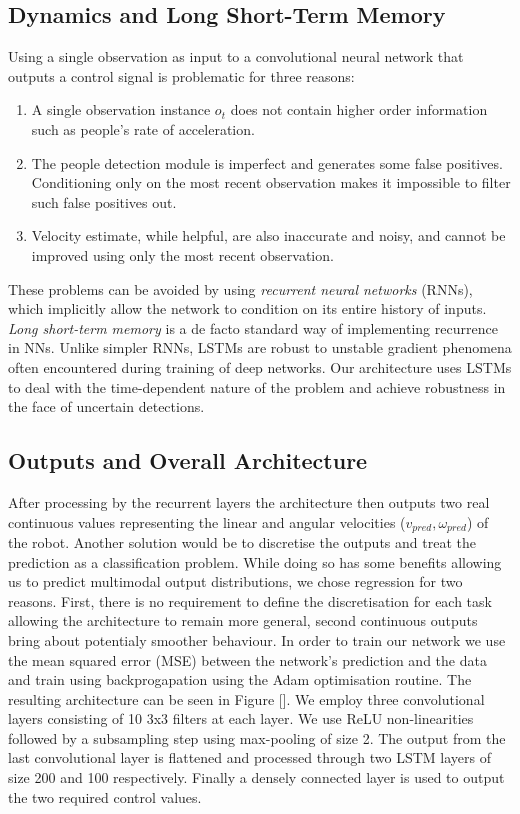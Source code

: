 \documentclass[letterpaper, 10 pt, conference]{ieeeconf}
\begin{document}
\subsection{Dynamics and Long Short-Term Memory}
Using a single observation as input to a convolutional neural network that outputs a control signal is problematic for three reasons:

\begin{enumerate}
\item A single observation instance $o_t$ does not contain higher order information such as people's rate of  acceleration.
\item The people detection module is imperfect and generates some false positives.  Conditioning only on the most recent observation makes it impossible to filter such false positives out.
\item Velocity estimate, while helpful, are also inaccurate and noisy, and cannot be improved using only the most recent observation.
\end{enumerate}

These problems can be avoided by using \emph{recurrent neural networks} (RNNs), which implicitly allow the network to condition on its entire history of inputs.  \emph{Long short-term memory} \cite{hochreiter1997long} is a de facto standard way of implementing recurrence in NNs. Unlike simpler RNNs, LSTMs are robust to unstable gradient phenomena often encountered during training of deep networks. Our architecture uses LSTMs to deal with the time-dependent nature of the problem and achieve robustness in the face of uncertain detections.

\subsection{Outputs and Overall Architecture}
After processing by the recurrent layers the architecture then outputs two real continuous values representing the linear and angular velocities ($v_{pred},\omega_{pred}$) of the robot. Another solution would be to discretise the outputs and treat the prediction as a classification problem. While doing so has some benefits allowing us to predict multimodal output distributions, we chose regression for two reasons. First, there is no requirement to define the discretisation for each task allowing the architecture to remain more general, second continuous outputs bring about potentialy smoother behaviour. In order to train our network we use the mean squared error (MSE) between the network's prediction and the data and train using backprogapation using the Adam \cite{kingma2014adam} optimisation routine. The resulting architecture can be seen in Figure []. We employ three convolutional layers consisting of 10 3x3 filters at each layer. We use ReLU non-linearities followed by a subsampling step using max-pooling of size 2. The output from the last convolutional layer is flattened and processed through two LSTM layers of size 200 and 100 respectively. Finally a densely connected layer is used to output the two required control values. 
 
\end{document}
